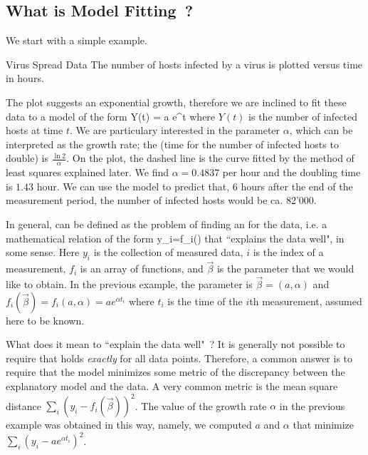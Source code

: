 \subsection{What is Model Fitting~?} We start with a simple
example.
\begin{ex}{Virus Spread Data}\label{ex-virus-spread}
The number of hosts infected by a virus is plotted versus time in
hours.


The plot suggests an exponential growth, therefore we are inclined
to fit these data to a model of the form
  \be
  Y(t) = a e^{\alpha t} \label{eq-modfit-0}
  \ee
where $Y(t)$ is the number of infected hosts at time $t$. We
are particulary interested in the parameter $\alpha$, which can
be interpreted as the growth rate; the  (time
for the number of infected hosts to double) is $\frac{\ln
2}{\alpha}$. On the plot, the dashed line is the curve fitted
by the method of least squares explained later. We find
$\alpha=0.4837$ per hour and the doubling time is $1.43$ hour.
We can use the model to predict that, 6 hours after the end of
the measurement period, the number of infected hosts would be
ca. 82'000.
\end{ex}

In general,  can be defined as the problem of
finding an  for the data, i.e. a mathematical
relation of the form
 \be y_i=f_i(\vec{\beta})  \label{eq-modfit-1}\ee
that ``explains the data well", in some sense. Here $y_i$  is the
collection of measured data, $i$ is the index of a measurement,
$f_i$ is an array of functions, and $\vec{\beta}$ is the parameter
that we would like to obtain. In the previous example, the parameter
is $\vec{\beta}=(a, \alpha)$ and $f_i(\vec{\beta})=f_i(a,\alpha)=a
e^{\alpha t_i}$ where $t_i$ is the time of the $i$th measurement,
assumed here to be known.

What does it mean to ``explain the data well"~? It is generally not
possible to require that  holds \emph{exactly} for
all data points. Therefore, a common answer is to require that the
model minimizes some metric of the discrepancy between the
explanatory model and the data. A very common metric is the mean
square distance $\sum_i \left(y_i- f_i(\vec{\beta})\right)^2$. The
value of the growth rate $\alpha$ in the previous example was
obtained in this way, namely, we computed $a$ and $\alpha$ that
minimize $\sum_i (y_i - a e^{\alpha t_i} )^2$.
%

